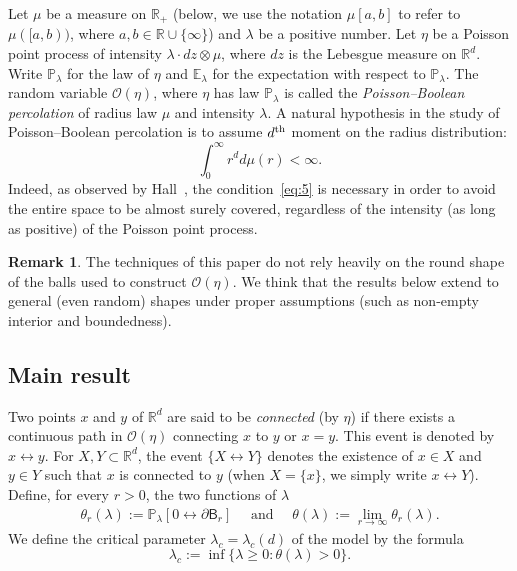 \documentclass[10pt]{amsart}
\theoremstyle{definition}\newtheorem{defi}[theo]{Definition}\newtheorem{rema}[theo]{Remark}\newtheorem{exam}[theo]{Example}\newtheorem{exem}[theo]{Example}\newtheorem{nota}[theo]{Notation}
\begin{document}
Let $ \mu$ be a measure on ${\mathbb R}_+$ (below, we use the notation $\mu[a,b]$ to refer to $\mu([a,b))$, where $a,b\in{\mathbb R}\cup\{\infty\}$) and $\lambda$ be a positive number. Let $\eta$ be a Poisson point process of intensity $ \lambda \cdot dz\otimes \mu$, where $dz$ is the Lebesgue measure on ${\mathbb R}^d$. Write ${\mathbb P}_\lambda$ for the law of $\eta$ and ${\mathbb E}_\lambda$ for the expectation with respect to ${\mathbb P}_\lambda$. The random variable ${\mathcal O}(\eta)$, where $\eta$ has law ${\mathbb P}_\lambda$ is called the \emph{Poisson--Boolean percolation} of radius law $\mu$ and intensity $\lambda$. A natural hypothesis in the study of Poisson--Boolean percolation is to assume $d^{\rm th}$ moment on the radius distribution:
\begin{equation}\label{eq:5}
\int_0^\infty r^d d\mu(r) <\infty.
\end{equation}
Indeed, as observed by Hall~\cite{Hal}, the condition~\eqref{eq:5} is necessary in order to avoid the entire space to be almost surely covered, regardless of the intensity (as long as positive) of the Poisson point process.

\begin{rema}
The techniques of this paper do not rely heavily on the round shape of the balls used to construct $\mathcal O(\eta)$. We think that the results below extend to general (even random) shapes under proper assumptions (such as non-empty interior and boundedness).
\end{rema}

\subsection{Main result}
Two points $x$ and $y$ of ${\mathbb R}^d$ are said to be \emph{connected} (by $\eta$) if there exists a continuous path in ${\mathcal O}(\eta)$ connecting $x$ to $y$ or $x = y$. This event is denoted by $x\longleftrightarrow y$. For $X, Y \subset {\mathbb R}^d$, the event $\{X\longleftrightarrow Y\}$ denotes the existence of $x \in X$ and $y \in Y$ such that $x$ is connected to $y$ (when $X=\{x\}$, we simply write $x\longleftrightarrow Y$). Define, for every $r>0$, the two functions of $\lambda$
\begin{align*}
\theta_r(\lambda):={\mathbb P}_\lambda[0\stackrel{}\longleftrightarrow \partial\mathsf B_r]\quad\text{ and }\quad\theta(\lambda):=\lim_{r\rightarrow\infty}\theta_r(\lambda).
\end{align*}
We define the critical parameter $\lambda_c=\lambda_c(d)$ of the model by the formula
\[
\lambda_c:=\inf\{\lambda\ge 0:\theta(\lambda)>0\}.
\]
\end{document}
